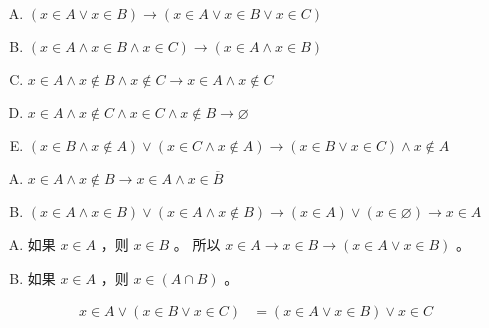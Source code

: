 {{        %
        \begin{practices}
            \begin{enumerate}[A.]
                \item $(x \in A \vee x \in B) \rightarrow (x \in A \vee x \in B \vee x \in C)$
                \item $(x \in A \wedge x \in B \wedge x \in C) \rightarrow (x \in A \wedge x \in B)$
                \item $x \in A \wedge x \notin B \wedge x \notin C \rightarrow x \in A \wedge x \notin C$
                \item $x \in A \wedge x \notin C \wedge x \in C \wedge x \notin B \rightarrow \varnothing$
                \item $(x \in B \wedge x \notin A) \vee (x \in C \wedge x \notin A) \rightarrow (x \in B \vee x \in C) \wedge x \notin A$
            \end{enumerate}
        \end{practices}

        \begin{practices}
            \begin{enumerate}[A.]
                \item $x \in A \wedge x \notin B \rightarrow x \in A \wedge x \in \overline{B}$
                \item $(x \in A \wedge x \in B) \vee (x \in A \wedge x \notin B) \rightarrow (x \in A) \vee (x \in \varnothing) \rightarrow x \in A$
            \end{enumerate}
        \end{practices}

        \begin{practices}
            \begin{enumerate}[A.]
                \item
                {
                    如果 $x \in A$ ，则 $x \in B$ 。
                    所以 $x \in A \rightarrow x \in B \rightarrow (x \in A \vee x \in B)$ 。
                }
                \item
                {
                    如果 $x \in A$ ，则 $x \in (A \cap B)$ 。
                }
            \end{enumerate}
        \end{practices}

        \begin{practices}
            \begin{align*}
                x \in A \vee (x \in B \vee x \in C)
                &= (x \in A \vee x \in B) \vee x \in C
            \end{align*}
        \end{practices}

}}
